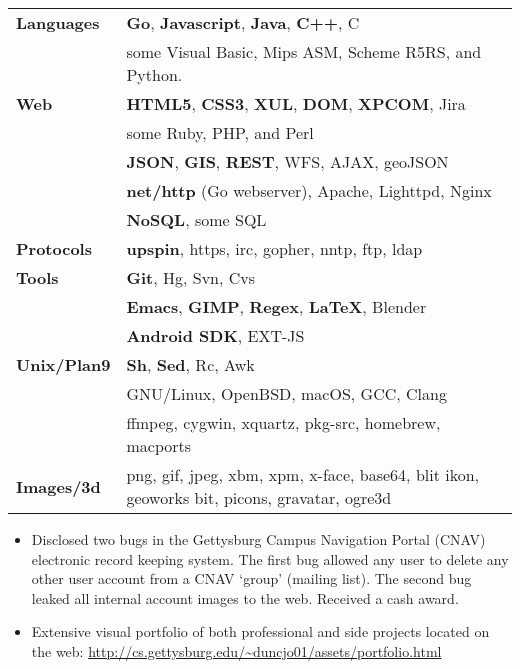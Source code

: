 \documentclass[11pt]{article}
\begin{document}
	\begin{tabular}{ l l }
  	\textbf{Languages} & \textbf{Go}, \textbf{Javascript}, \textbf{Java}, \textbf{C++}, C \\
  	& some Visual Basic, Mips ASM, Scheme R5RS, and Python. \\
  	
  	\textbf{Web} & \textbf{HTML5}, \textbf{CSS3}, \textbf{XUL}, \textbf{DOM}, \textbf{XPCOM}, Jira \\
  	& some Ruby, PHP, and Perl \\
  	& \textbf{JSON}, \textbf{GIS}, \textbf{REST}, WFS, AJAX, geoJSON \\
  	& \textbf{net/http} (Go webserver), Apache, Lighttpd, Nginx \\
  	& \textbf{NoSQL}, some SQL \\
  	\textbf{Protocols} & \textbf{upspin}, https, irc, gopher, nntp, ftp, ldap \\
  	
  	\textbf{Tools} & \textbf{Git}, Hg, Svn, Cvs \\
  	& \textbf{Emacs}, \textbf{GIMP}, \textbf{Regex}, \textbf{\LaTeX}, Blender \\
  	& \textbf{Android SDK}, EXT-JS \\
  	
  	\textbf{Unix/Plan9} & \textbf{Sh}, \textbf{Sed}, Rc, Awk \\
  	&GNU/Linux, OpenBSD, macOS, GCC, Clang \\
  	&ffmpeg, cygwin, xquartz, pkg-src, homebrew, macports \\
  	\textbf{Images/3d} & png, gif, jpeg, xbm, xpm, x-face, base64, blit ikon, geoworks bit, picons, gravatar, ogre3d \\
  	
	\end{tabular}
\begin{itemize}
	\item Disclosed two bugs in the Gettysburg Campus Navigation Portal (CNAV) electronic record keeping system. The first bug allowed any user to delete any other user account from a CNAV `group' (mailing list). The second bug leaked all internal account images to the web. Received a cash award.
	\item Extensive visual portfolio of both professional and side projects located on the web: \url{http://cs.gettysburg.edu/~duncjo01/assets/portfolio.html}
\end{itemize}
\end{document}
